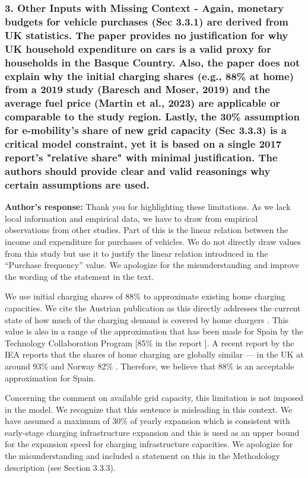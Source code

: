 \documentclass[11pt]{article}
\begin{document}
\subsubsection*{3. Other Inputs with Missing Context - Again, monetary budgets for vehicle purchases (Sec 3.3.1) are derived from UK statistics. The paper provides no justification for why UK household expenditure on cars is a valid proxy for households in the Basque Country. Also, the paper does not explain why the initial charging shares (e.g., 88\% at home) from a 2019 study (Baresch and Moser, 2019) and the average fuel price (Martin et al., 2023) are applicable or comparable to the study region. Lastly, the 30\% assumption for e-mobility's share of new grid capacity (Sec 3.3.3) is a critical model constraint, yet it is based on a single 2017 report's "relative share" with minimal justification. The authors should provide clear and valid reasonings why certain assumptions are used.}
\color{authorblue}
\noindent \textcolor{authorblue}{\textbf{Author's response:}}  Thank you for highlighting these limitations. As we lack local information and empirical data, we have to draw from empirical observations from other studies. Part of this is the linear relation between the income and expenditure for purchases of vehicles. We do not directly draw values from this study but use it to justify the linear relation introduced in the “Purchase frequency” value. We apologize for the misunderstanding and improve the wording of the statement in the text. 

We use initial charging shares of 88\% to approximate existing home charging capacities. We cite the Austrian publication as this directly addresses the current state of how much of the charging demand is covered by home chargers \cite{BARESCH2019388}. This value is also in a range of the approximation that has been made for Spain by the Technology Collaboration Program [85\% in the report \citep{HEVTCP2024}]. A recent report by the IEA reports that the shares of home charging are globally similar --- in the UK at around 93\% and Norway 82\% \citep{IEA2024}. Therefore, we believe that 88\% is an acceptable approximation for Spain. 

Concerning the comment on available grid capacity, this limitation is not imposed in the model. We recognize that this sentence is misleading in this context. We have assumed a maximum of 30\% of yearly expansion which is consistent with early-stage charging infrastructure expansion and this is used as an upper bound for the expansion speed for charging infrastructure capacities. We apologize for the misunderstanding and included a statement on this in the Methodology description (see Section 3.3.3).
\color{reviewergrey}
\end{document}
